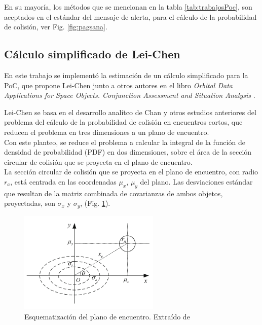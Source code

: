 {En su mayor\'ia, los m\'etodos que se mencionan en la tabla \ref{tab:trabajosPoc}, son aceptados en el est\'andar del mensaje de alerta, para el c\'alculo de la probabilidad de colisi\'on, ver Fig. \ref{fig:pagsana}.

% 
  

\subsection{C\'alculo simplificado de Lei-Chen}\label{subsec:pocsimp}

En este trabajo se implement\'o la estimaci\'on de un c\'alculo simplificado para la PoC, que propone Lei-Chen junto a otros autores en el libro 
{\it{Orbital Data Applications for Space Objects. Conjunction Assessment and Situation Analysis}} \citep{leichen}.

Lei-Chen se basa en el desarrollo anal\'itco de Chan \citep{chan2003improved} y otros estudios anteriores del problema del c\'alculo de la probabilidad de colisi\'on en encuentros cortos, que reducen el problema en tres dimensiones a un plano de encuentro.\\
Con este planteo, se reduce el problema a calcular la integral de la funci\'on de densidad de probabilidad (PDF) en dos dimensiones, sobre el \'area de la secci\'on circular de colisi\'on que se proyecta en el plano de encuentro.\\

La secci\'on circular de colisi\'on que se proyecta en el plano de encuentro, con radio $r_{a}$, est\'a centrada en las coordenadas $\mu_{x}$, $\mu_{y}$ del plano. Las desviaciones est\'andar que resultan de la matriz combinada de covarianzas de ambos objetos, proyectadas, son $\sigma_{x}$ y $\sigma_{y}$,  (Fig. \ref{fig:planoenc}).\\

\begin{figure}[!h]
\centering
\includegraphics[width=0.6\textwidth]{imagenes/planodeencuentro}
\caption[Plano de Encuentro]{Esquematizaci\'on del plano de encuentro. Extra\'ido de \cite{leichen}}
\label{fig:planoenc}
\end{figure}

}
